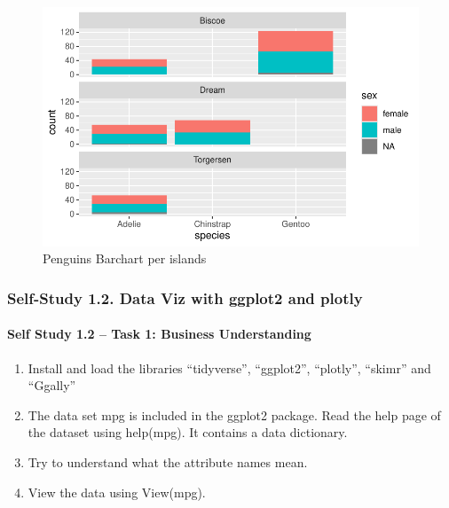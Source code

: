 \documentclass[
  letterpaper,
  DIV=11,
  numbers=noendperiod]{scrartcl}
\let\oldparagraph\paragraph
\renewcommand{\paragraph}[1]{\oldparagraph{#1}\mbox{}}
\begin{document}
\begin{figure}[H]

{\centering \includegraphics{Part1_Lecture1_Ex_files/figure-pdf/fig-penguins-barchart-1.pdf}

}

\caption{\label{fig-penguins-barchart}Penguins Barchart per islands}

\end{figure}

\hypertarget{self-study-1.2.-data-viz-with-ggplot2-and-plotly}{%
\subsubsection{Self-Study 1.2. Data Viz with ggplot2 and
plotly}\label{self-study-1.2.-data-viz-with-ggplot2-and-plotly}}

\hypertarget{self-study-1.2-task-1-business-understanding}{%
\paragraph{Self Study 1.2 -- Task 1: Business
Understanding}\label{self-study-1.2-task-1-business-understanding}}

\begin{enumerate}
\def\labelenumi{\arabic{enumi}.}
\item
  Install and load the libraries ``tidyverse'', ``ggplot2'', ``plotly'',
  ``skimr'' and ``Ggally''
\item
  The data set mpg is included in the ggplot2 package. Read the help
  page of the dataset using help(mpg). It contains a data dictionary.
\item
  Try to understand what the attribute names mean.
\item
  View the data using View(mpg).
\end{enumerate}
\end{document}
